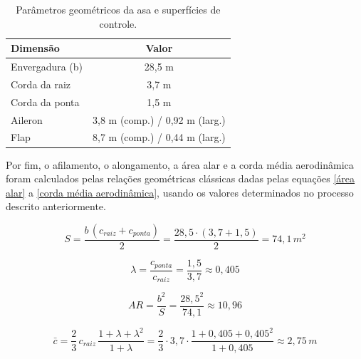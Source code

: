 \begin{table}[H]
  \centering
  \linespread{1}\small
  \setlength{\tabcolsep}{4pt}
  \caption{Parâmetros geométricos da asa e superfícies de controle.}
  \label{tab:dimensões da asa}
  \begin{tabularx}{\textwidth}{L C}
    \toprule
    \textbf{Dimensão} & \textbf{Valor} \\
    \midrule
    Envergadura (b) & 28,5 m \\
    Corda da raiz & 3,7 m \\
    Corda da ponta & 1,5 m \\
    Aileron & 3,8 m (comp.) / 0,92 m (larg.) \\
    Flap & 8,7 m (comp.) / 0,44 m (larg.) \\
    \bottomrule
  \end{tabularx}
\end{table}

Por fim, o afilamento, o alongamento, a área alar e a corda média aerodinâmica foram calculados pelas relações geométricas clássicas dadas pelas equações \eqref{área alar} a \eqref{corda média aerodinâmica}, usando os valores determinados no processo descrito anteriormente.

\begin{equation}
S = \frac{b \, (c_{raiz} + c_{ponta})}{2} = \frac{28,5 \cdot (3,7 + 1,5)}{2} = 74,1 \, m^2
\label{área alar}
\end{equation}

\begin{equation}
\lambda = \frac{c_{ponta}}{c_{raiz}} = \frac{1,5}{3,7} \approx 0,405
\label{afilamento}
\end{equation}

\begin{equation}
AR = \frac{b^2}{S} = \frac{28,5^2}{74,1} \approx 10,96
\label{alongamento}
\end{equation}

\begin{equation}
\bar{c} = \frac{2}{3} \, c_{raiz} \, \frac{1 + \lambda + \lambda^2}{1 + \lambda} = \frac{2}{3} \cdot 3,7 \cdot \frac{1 + 0,405 + 0,405^2}{1 + 0,405} \approx 2,75 \, m
\label{corda média aerodinâmica}
\end{equation}


